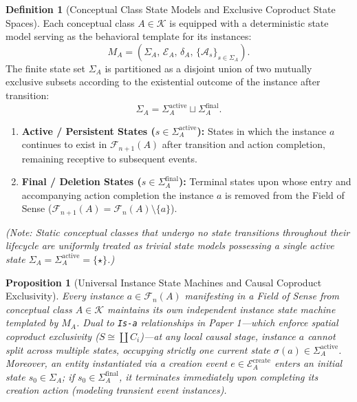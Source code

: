 \documentclass[11pt,a4paper]{article}
\theoremstyle{definition}
\newtheorem{definition}{Definition}[section]
\theoremstyle{plain}
\newtheorem{proposition}{Proposition}[section]
\theoremstyle{remark}
\begin{document}
\begin{definition}[Conceptual Class State Models and Exclusive Coproduct State Spaces]\label{def:state-model}
Each conceptual class $A \in \mathcal{K}$ is equipped with a deterministic state model serving as the behavioral template for its instances:
\begin{equation}
M_A = \left(\Sigma_A,\, \mathcal{E}_A,\, \delta_A,\, \{\mathcal{A}_s\}_{s \in \Sigma_A}\right).
\end{equation}
The finite state set $\Sigma_A$ is partitioned as a disjoint union of two mutually exclusive subsets according to the existential outcome of the instance after transition:
\begin{equation}
\Sigma_A = \Sigma_A^{\mathrm{active}} \sqcup \Sigma_A^{\mathrm{final}}.
\end{equation}
\begin{enumerate}
    \item \textbf{Active / Persistent States ($s \in \Sigma_A^{\mathrm{active}}$):} States in which the instance $a$ continues to exist in $\mathcal{F}_{n+1}(A)$ after transition and action completion, remaining receptive to subsequent events.
    \item \textbf{Final / Deletion States ($s \in \Sigma_A^{\mathrm{final}}$):} Terminal states upon whose entry and accompanying action completion the instance $a$ is removed from the Field of Sense ($\mathcal{F}_{n+1}(A) = \mathcal{F}_n(A) \setminus \{a\}$).
\end{enumerate}
\emph{(Note: Static conceptual classes that undergo no state transitions throughout their lifecycle are uniformly treated as trivial state models possessing a single active state $\Sigma_A = \Sigma_A^{\mathrm{active}} = \{\star\}$.)}
\end{definition}

\begin{proposition}[Universal Instance State Machines and Causal Coproduct Exclusivity]\label{prop:instance-fsm}
Every instance $a \in \mathcal{F}_n(A)$ manifesting in a Field of Sense from conceptual class $A \in \mathcal{K}$ maintains its own independent instance state machine templated by $M_A$. Dual to \texttt{Is-a} relationships in Paper 1---which enforce spatial coproduct exclusivity ($S \cong \coprod C_i$)---at any local causal stage, instance $a$ cannot split across multiple states, occupying strictly one current state $\sigma(a) \in \Sigma_A^{\mathrm{active}}$. Moreover, an entity instantiated via a creation event $e \in \mathcal{E}_A^{\mathrm{create}}$ enters an initial state $s_0 \in \Sigma_A$; if $s_0 \in \Sigma_A^{\mathrm{final}}$, it terminates immediately upon completing its creation action (modeling transient event instances).
\end{proposition}
\end{document}

